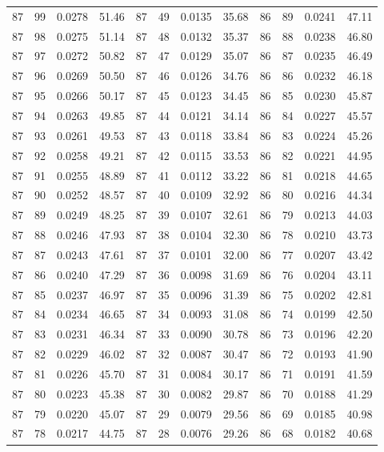 \begin{tabular}{llll|llll|llll}
87 & 99 & 0.0278 & 51.46 & 87 & 49 & 0.0135 & 35.68 & 86 & 89 & 0.0241 & 47.11\\
87 & 98 & 0.0275 & 51.14 & 87 & 48 & 0.0132 & 35.37 & 86 & 88 & 0.0238 & 46.80\\
87 & 97 & 0.0272 & 50.82 & 87 & 47 & 0.0129 & 35.07 & 86 & 87 & 0.0235 & 46.49\\
87 & 96 & 0.0269 & 50.50 & 87 & 46 & 0.0126 & 34.76 & 86 & 86 & 0.0232 & 46.18\\
87 & 95 & 0.0266 & 50.17 & 87 & 45 & 0.0123 & 34.45 & 86 & 85 & 0.0230 & 45.87\\
87 & 94 & 0.0263 & 49.85 & 87 & 44 & 0.0121 & 34.14 & 86 & 84 & 0.0227 & 45.57\\
87 & 93 & 0.0261 & 49.53 & 87 & 43 & 0.0118 & 33.84 & 86 & 83 & 0.0224 & 45.26\\
87 & 92 & 0.0258 & 49.21 & 87 & 42 & 0.0115 & 33.53 & 86 & 82 & 0.0221 & 44.95\\
87 & 91 & 0.0255 & 48.89 & 87 & 41 & 0.0112 & 33.22 & 86 & 81 & 0.0218 & 44.65\\
87 & 90 & 0.0252 & 48.57 & 87 & 40 & 0.0109 & 32.92 & 86 & 80 & 0.0216 & 44.34\\
87 & 89 & 0.0249 & 48.25 & 87 & 39 & 0.0107 & 32.61 & 86 & 79 & 0.0213 & 44.03\\
87 & 88 & 0.0246 & 47.93 & 87 & 38 & 0.0104 & 32.30 & 86 & 78 & 0.0210 & 43.73\\
87 & 87 & 0.0243 & 47.61 & 87 & 37 & 0.0101 & 32.00 & 86 & 77 & 0.0207 & 43.42\\
87 & 86 & 0.0240 & 47.29 & 87 & 36 & 0.0098 & 31.69 & 86 & 76 & 0.0204 & 43.11\\
87 & 85 & 0.0237 & 46.97 & 87 & 35 & 0.0096 & 31.39 & 86 & 75 & 0.0202 & 42.81\\
87 & 84 & 0.0234 & 46.65 & 87 & 34 & 0.0093 & 31.08 & 86 & 74 & 0.0199 & 42.50\\
87 & 83 & 0.0231 & 46.34 & 87 & 33 & 0.0090 & 30.78 & 86 & 73 & 0.0196 & 42.20\\
87 & 82 & 0.0229 & 46.02 & 87 & 32 & 0.0087 & 30.47 & 86 & 72 & 0.0193 & 41.90\\
87 & 81 & 0.0226 & 45.70 & 87 & 31 & 0.0084 & 30.17 & 86 & 71 & 0.0191 & 41.59\\
87 & 80 & 0.0223 & 45.38 & 87 & 30 & 0.0082 & 29.87 & 86 & 70 & 0.0188 & 41.29\\
87 & 79 & 0.0220 & 45.07 & 87 & 29 & 0.0079 & 29.56 & 86 & 69 & 0.0185 & 40.98\\
87 & 78 & 0.0217 & 44.75 & 87 & 28 & 0.0076 & 29.26 & 86 & 68 & 0.0182 & 40.68\\

\end{tabular}
